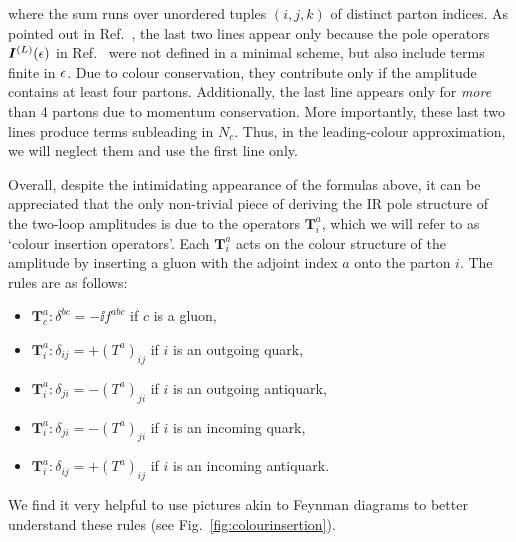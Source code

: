\documentclass[main.tex]{subfiles}
\begin{document}
where the sum runs over unordered tuples $(i,j,k)$ of distinct parton indices. As pointed out in Ref.~\cite{Becher:2009cu}, the last two lines appear only because the pole operators $\bm{I}^{(L)}(\epsilon)$ in Ref.~\cite{Catani:1998bh} were not defined in a minimal scheme, but also include terms finite in $\epsilon$. Due to colour conservation, they contribute only if the amplitude contains at least four partons. Additionally, the last line appears only for \textit{more} than 4 partons due to momentum conservation. More importantly, these last two lines produce terms subleading in $N_c$. Thus, in the leading-colour approximation, we will neglect them and use the first line only.

Overall, despite the intimidating appearance of the formulas above, it can be appreciated that the only non-trivial piece of deriving the IR pole structure of the two-loop amplitudes is due to the operators $\bm{T}_i^a$, which we will refer to as `colour insertion operators'. Each $\bm{T}_i^a$ acts on the colour structure of the amplitude by inserting a gluon with the adjoint index $a$ onto the parton $i$. The rules are as follows:
\begin{itemize}
    \item $\bm{T}_c^a: \delta^{bc} = -\ii f^{abc}$ if $c$ is a gluon,
    \item $\bm{T}_i^a: \delta_{ij} = + (T^a)_{ij}$ if $i$ is an outgoing quark,
    \item $\bm{T}_i^a: \delta_{ji} = - (T^a)_{ji}$ if $i$ is an outgoing antiquark,
    \item $\bm{T}_i^a: \delta_{ji} = - (T^a)_{ji}$ if $i$ is an incoming quark,
    \item $\bm{T}_i^a: \delta_{ij} = + (T^a)_{ij}$ if $i$ is an incoming antiquark.
\end{itemize}
We find it very helpful to use pictures akin to Feynman diagrams to better understand these rules (see  Fig.~\ref{fig:colourinsertion}). 
\end{document}
